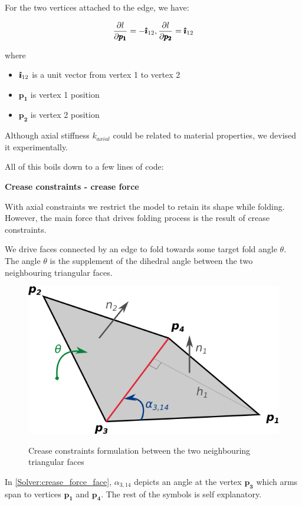 For the two vertices attached to the edge, we have:

$$ \frac{\partial l}{\partial \pmb{p_{1}}} = -\pmb{\hat{\imath}}_{12}, \frac{\partial l}{\partial \pmb{p_{2}}} = \pmb{\hat{\imath}}_{12} $$

where
\begin{itemize}
	\item $\pmb{\hat{\imath}}_{12}$ is a unit vector from vertex 1 to vertex 2
	\item $\pmb{p_{1}}$ is vertex 1 position
	\item $\pmb{p_{2}}$ is vertex 2 position
\end{itemize}

Although axial stiffness $k_{axial}$ could be related to material properties, we devised it experimentally.

All of this boils down to a few lines of code:




\medskip
\textbf{Crease constraints - crease force}

With axial constraints we restrict the model to retain its shape while folding.
However, the main force that drives folding process is the result of crease constraints.
\smallskip

We drive faces connected by an edge to fold towards some target fold angle $\theta$.
The angle $\theta$ is the supplement of the dihedral angle between the two neighbouring triangular faces.

\begin{figure}[H]
	\caption{Crease constraints formulation between the two neighbouring triangular faces}
    \centering
	\includegraphics[width=.6\linewidth]{assets/3-crease_force_face.png}
	\label{Solver:crease_force_face}
\end{figure}

In \autoref{Solver:crease_force_face}, $\alpha_{3,14}$ depicts an angle at the vertex $\pmb{p_3}$ 
which arms span to vertices $\pmb{p_1}$ and $\pmb{p_4}$. The rest of the symbols is self explanatory.

